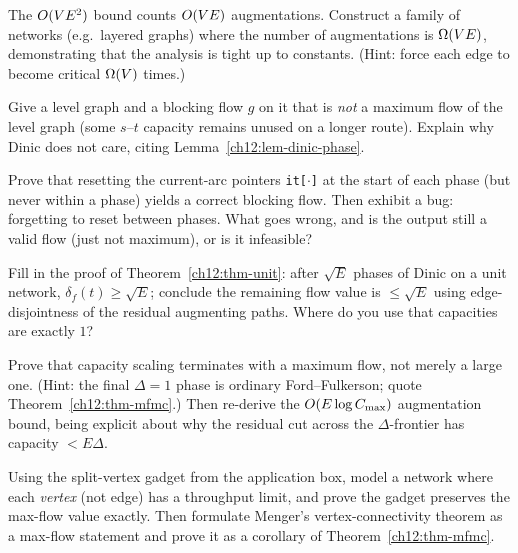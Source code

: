 \begin{exercise}
The $O(VE^2)$ bound counts $O(VE)$ augmentations. Construct a family of
networks (e.g.\ layered graphs) where the number of augmentations is $\Omega(VE)$,
demonstrating that the analysis is tight up to constants. (Hint: force each edge to
become critical $\Omega(V)$ times.)
\end{exercise}

\begin{exercise}
Give a level graph and a blocking flow $g$ on it that is \emph{not} a maximum flow
of the level graph (some $s$--$t$ capacity remains unused on a longer route).
Explain why Dinic does not care, citing Lemma~\ref{ch12:lem-dinic-phase}.
\end{exercise}

\begin{exercise}
Prove that resetting the current-arc pointers \texttt{it[}$\cdot$\texttt{]} at the
start of each phase (but never within a phase) yields a correct blocking flow. Then
exhibit a bug: forgetting to reset between phases. What goes wrong, and is the
output still a valid flow (just not maximum), or is it infeasible?
\end{exercise}

\begin{exercise}
Fill in the proof of Theorem~\ref{ch12:thm-unit}: after $\sqrt{E}$ phases of Dinic
on a unit network, $\delta_f(t)\ge\sqrt{E}$; conclude the remaining flow value is
$\le\sqrt{E}$ using edge-disjointness of the residual augmenting paths. Where do
you use that capacities are exactly $1$?
\end{exercise}

\begin{exercise}
Prove that capacity scaling terminates with a maximum flow, not merely a large one.
(Hint: the final $\Delta=1$ phase is ordinary Ford--Fulkerson; quote
Theorem~\ref{ch12:thm-mfmc}.) Then re-derive the $O(E\log C_{\max})$ augmentation
bound, being explicit about why the residual cut across the $\Delta$-frontier has
capacity $<E\Delta$.
\end{exercise}

\begin{exercise}
Using the split-vertex gadget from the application box, model a network where each
\emph{vertex} (not edge) has a throughput limit, and prove the gadget preserves the
max-flow value exactly. Then formulate Menger's vertex-connectivity theorem as a
max-flow statement and prove it as a corollary of Theorem~\ref{ch12:thm-mfmc}.
\end{exercise}

